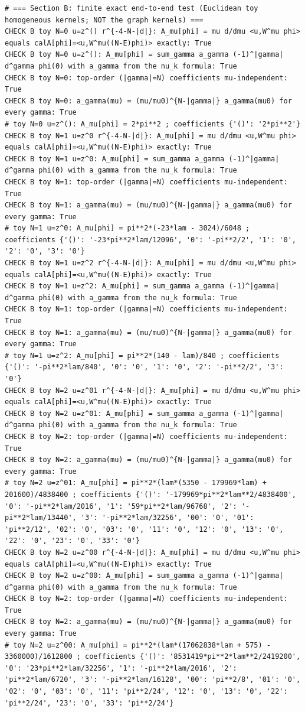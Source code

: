 \documentclass{article}
\theoremstyle{remark}
\begin{document}
\begin{lstlisting}
# === Section B: finite exact end-to-end test (Euclidean toy homogeneous kernels; NOT the graph kernels) ===
CHECK B toy N=0 u=z^() r^{-4-N-|d|}: A_mu[phi] = mu d/dmu <u,W^mu phi> equals calA[phi]=<u,W^mu((N-E)phi)> exactly: True
CHECK B toy N=0 u=z^(): A_mu[phi] = sum_gamma a_gamma (-1)^|gamma| d^gamma phi(0) with a_gamma from the nu_k formula: True
CHECK B toy N=0: top-order (|gamma|=N) coefficients mu-independent: True
CHECK B toy N=0: a_gamma(mu) = (mu/mu0)^{N-|gamma|} a_gamma(mu0) for every gamma: True
# toy N=0 u=z^(): A_mu[phi] = 2*pi**2 ; coefficients {'()': '2*pi**2'}
CHECK B toy N=1 u=z^0 r^{-4-N-|d|}: A_mu[phi] = mu d/dmu <u,W^mu phi> equals calA[phi]=<u,W^mu((N-E)phi)> exactly: True
CHECK B toy N=1 u=z^0: A_mu[phi] = sum_gamma a_gamma (-1)^|gamma| d^gamma phi(0) with a_gamma from the nu_k formula: True
CHECK B toy N=1: top-order (|gamma|=N) coefficients mu-independent: True
CHECK B toy N=1: a_gamma(mu) = (mu/mu0)^{N-|gamma|} a_gamma(mu0) for every gamma: True
# toy N=1 u=z^0: A_mu[phi] = pi**2*(-23*lam - 3024)/6048 ; coefficients {'()': '-23*pi**2*lam/12096', '0': '-pi**2/2', '1': '0', '2': '0', '3': '0'}
CHECK B toy N=1 u=z^2 r^{-4-N-|d|}: A_mu[phi] = mu d/dmu <u,W^mu phi> equals calA[phi]=<u,W^mu((N-E)phi)> exactly: True
CHECK B toy N=1 u=z^2: A_mu[phi] = sum_gamma a_gamma (-1)^|gamma| d^gamma phi(0) with a_gamma from the nu_k formula: True
CHECK B toy N=1: top-order (|gamma|=N) coefficients mu-independent: True
CHECK B toy N=1: a_gamma(mu) = (mu/mu0)^{N-|gamma|} a_gamma(mu0) for every gamma: True
# toy N=1 u=z^2: A_mu[phi] = pi**2*(140 - lam)/840 ; coefficients {'()': '-pi**2*lam/840', '0': '0', '1': '0', '2': '-pi**2/2', '3': '0'}
CHECK B toy N=2 u=z^01 r^{-4-N-|d|}: A_mu[phi] = mu d/dmu <u,W^mu phi> equals calA[phi]=<u,W^mu((N-E)phi)> exactly: True
CHECK B toy N=2 u=z^01: A_mu[phi] = sum_gamma a_gamma (-1)^|gamma| d^gamma phi(0) with a_gamma from the nu_k formula: True
CHECK B toy N=2: top-order (|gamma|=N) coefficients mu-independent: True
CHECK B toy N=2: a_gamma(mu) = (mu/mu0)^{N-|gamma|} a_gamma(mu0) for every gamma: True
# toy N=2 u=z^01: A_mu[phi] = pi**2*(lam*(5350 - 179969*lam) + 201600)/4838400 ; coefficients {'()': '-179969*pi**2*lam**2/4838400', '0': '-pi**2*lam/2016', '1': '59*pi**2*lam/96768', '2': '-pi**2*lam/13440', '3': '-pi**2*lam/32256', '00': '0', '01': 'pi**2/12', '02': '0', '03': '0', '11': '0', '12': '0', '13': '0', '22': '0', '23': '0', '33': '0'}
CHECK B toy N=2 u=z^00 r^{-4-N-|d|}: A_mu[phi] = mu d/dmu <u,W^mu phi> equals calA[phi]=<u,W^mu((N-E)phi)> exactly: True
CHECK B toy N=2 u=z^00: A_mu[phi] = sum_gamma a_gamma (-1)^|gamma| d^gamma phi(0) with a_gamma from the nu_k formula: True
CHECK B toy N=2: top-order (|gamma|=N) coefficients mu-independent: True
CHECK B toy N=2: a_gamma(mu) = (mu/mu0)^{N-|gamma|} a_gamma(mu0) for every gamma: True
# toy N=2 u=z^00: A_mu[phi] = pi**2*(lam*(17062838*lam + 575) - 3360000)/1612800 ; coefficients {'()': '8531419*pi**2*lam**2/2419200', '0': '23*pi**2*lam/32256', '1': '-pi**2*lam/2016', '2': 'pi**2*lam/6720', '3': '-pi**2*lam/16128', '00': 'pi**2/8', '01': '0', '02': '0', '03': '0', '11': 'pi**2/24', '12': '0', '13': '0', '22': 'pi**2/24', '23': '0', '33': 'pi**2/24'}


\end{lstlisting}
\end{document}
